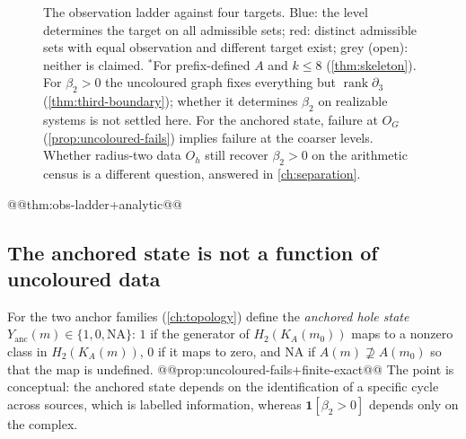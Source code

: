 \begin{figure}[ht]\centering
{}
\caption{The observation ladder against four targets. Blue: the level determines the target on all admissible sets; red: distinct admissible sets with equal observation and different target exist; grey (open): neither is claimed. $^\ast$For prefix-defined $A$ and $k\le8$ (\cref{thm:skeleton}). For $\beta_2>0$ the uncoloured graph fixes everything but $\operatorname{rank}\partial_3$ (\cref{thm:third-boundary}); whether it determines $\beta_2$ on realizable systems is not settled here. For the anchored state, failure at $O_G$ (\cref{prop:uncoloured-fails}) implies failure at the coarser levels. Whether radius-two data $O_h$ still recover $\beta_2>0$ on the arithmetic census is a different question, answered in \cref{ch:separation}.}\label{fig:ladder}
\end{figure}

@@thm:obs-ladder+analytic@@
\subsection*{The anchored state is not a function of uncoloured data}
For the two anchor families (\cref{ch:topology}) define the \emph{anchored hole state} $Y_{\mathrm{anc}}(m)\in\{1,0,\mathrm{NA}\}$: $1$ if the generator of $H_2(K_A(m_0))$ maps to a nonzero class in $H_2(K_A(m))$, $0$ if it maps to zero, and $\mathrm{NA}$ if $A(m)\not\supseteq A(m_0)$ so that the map is undefined.
@@prop:uncoloured-fails+finite-exact@@
The point is conceptual: the anchored state depends on the identification of a specific cycle across sources, which is labelled information, whereas $\mathbf 1[\beta_2>0]$ depends only on the complex.

